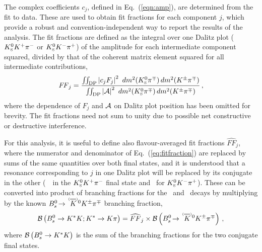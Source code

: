 The complex coefficients $c_j$, defined in Eq.~(\ref{eqn:amp}), are determined from the fit to data.
These are used to obtain fit fractions for each component $j$, which provide a robust and convention-independent way to report the results of the analysis.
The fit fractions are defined as the integral over one Dalitz plot (${{K}^0_{\mathrm{ \scriptscriptstyle S}}}{{K}^+}{{\pi}^-}$ or ${{K}^0_{\mathrm{ \scriptscriptstyle S}}}{{K}^-}{{\pi}^+}$) of the amplitude for each intermediate component squared, divided by that of the coherent matrix element squared for all intermediate contributions, 
\begin{equation}
{\it FF}_j =
\frac
{\int\!\!\int_{\rm DP}\left|c_j F_j\right|^2~dm^2({{K}^0_{\mathrm{ \scriptscriptstyle S}}}{{\pi}^\mp})\,dm^2({{K}^\pm}{{\pi}^\mp})}
{\int\!\!\int_{\rm DP}\left|{\cal A}\right|^2~dm^2({{K}^0_{\mathrm{ \scriptscriptstyle S}}}{{\pi}^\mp})\,dm^2({{K}^\pm}{{\pi}^\mp})} \, ,
\label{eq:fitfraction}
\end{equation}
where the dependence of $F_j$ and ${\cal A}$ on Dalitz plot position has been omitted for brevity.
The fit fractions need not sum to unity due to possible net constructive or destructive interference.

For this analysis, it is useful to define also flavour-averaged fit fractions $\widehat{FF}_{j}$, where the numerator and denominator of Eq.~(\ref{eq:fitfraction}) are replaced by sums of the same quantities over both final states, and it is understood that a resonance corresponding to $j$ in one Dalitz plot will be replaced by its conjugate in the other (\eg\ \KstarIm\ in the ${{K}^0_{\mathrm{ \scriptscriptstyle S}}}{{K}^+}{{\pi}^-}$ final state and \KstarIp\ for ${{K}^0_{\mathrm{ \scriptscriptstyle S}}}{{K}^-}{{\pi}^+}$).
These can be converted into product of branching fractions for the \Bs\ and \Kstar\ decays by multiplying by the known $\BsToKzBarOptKpi$ branching fraction,
\begin{equation}
  \label{eq:Chap-FFhat}
  \Br{\Bs \to \Kstar\kaon; \Kstar\to\kaon\pion} = \widehat{FF}_{j} \times \Br{\BsToKzBarOptKpi} \,, 
\end{equation}  
where ${\mathcal{B}}\left({{B}^0_{s}} \rightarrow {\ensuremath{{K}^*}}{\ensuremath{K}}\right)$ is the sum of the branching fractions for the two conjugate final states.
